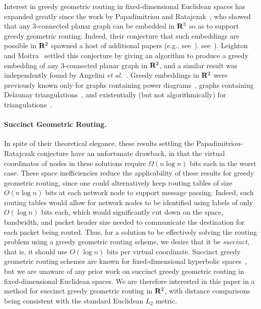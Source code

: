 \documentclass[11pt]{article}
\newcommand{\R}{{\bf R}}
\renewcommand{\subsection}[1]{\paragraph{#1.}}
\begin{document}
Interest in greedy geometric routing in fixed-dimensional Euclidean
spaces has expanded greatly since the work by Papadimitriou and
Ratajczak~\cite{pr-ocrgr-05}, who showed that any 3-connected planar graph
can be embedded in $\R^3$ so as to support greedy geometric routing. 
Indeed, their conjecture that such embeddings are possible in $\R^2$
spawned a host of additional papers (e.g., \ifFull see~\cite{afg-acgdt-08,cgw-dcvc-07,d-gdt-08,eg-sggdh-08,lp-oelia-08,m-adgra-07}).
\else
see~\cite{afg-acgdt-08,d-gdt-08,eg-sggdh-08,lp-oelia-08,m-adgra-07}).
\fi
Leighton and Moitra~\cite{lm-srgem-08} settled this conjecture by 
giving an algorithm to produce a greedy embedding of any 
3-connected planar graph in $\R^2$, and a similar result 
was independently found by Angelini {\it et al.}~\cite{afg-acgdt-08}. 
Greedy embeddings in $\R^2$ were previously known 
\ifFull only \fi for \ifFull graphs containing power 
diagrams~\cite{cgw-dcvc-07}, \fi graphs containing Delaunay 
triangulations~\cite{lp-oelia-08}, and existentially 
(but not algorithmically) for triangulations~\cite{d-gdt-08}.

\subsection{Succinct Geometric Routing}
In spite of their theoretical elegance, these results settling the
Papadimitriou-Ratajczak conjecture have an unfortunate drawback, in
that the virtual coordinates of nodes in these solutions require
$\Omega(n\log n)$ bits each in the worst case.
These space inefficiencies reduce the applicability of
these results for greedy geometric routing, since one could 
alternatively keep routing tables of size $O(n\log n)$ bits 
at each network node to support message passing.
Indeed, such routing tables would allow for network nodes to be identified
using labels of only $O(\log n)$ bits each, which would significantly
cut down on the space, bandwidth, and packet header size 
needed to communicate the
destination for each packet being routed.
Thus, for a solution to be effectively solving the routing problem
using a greedy geometric routing  scheme, we desire 
that it be
\emph{succinct}, that is, it should use
$O(\log{n})$ bits per virtual coordinate.
Succinct greedy geometric routing schemes are known for
fixed-dimensional hyperbolic spaces~\cite{eg-sggdh-08,m-adgra-07}, 
but we are unaware of any prior work on succinct greedy 
geometric routing in fixed-dimensional Euclidean spaces.
\ifFull
We are therefore interested in this paper in a method for 
succinct greedy geometric routing in $\R^2$, with distance comparisons being
consistent with the standard Euclidean $L_2$ metric.
\end{document}
